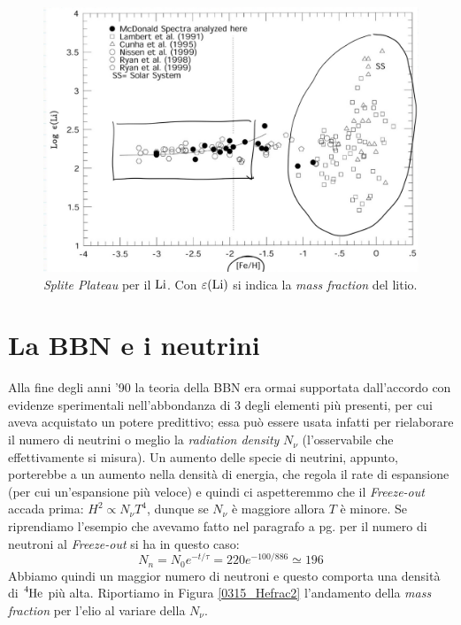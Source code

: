 \begin{figure}[h]
    \centering
    \includegraphics[scale=0.25]{Immagini/0315_LiH.png}
    \caption{\textit{Splite Plateau} per il $\ce{Li}$. Con $\varepsilon (\ce{Li})$ si indica la \textit{mass fraction} del litio.}
    \label{0315_LiH}
\end{figure}
\newpage
\section{La BBN e i neutrini}
Alla fine degli anni '90 la teoria della BBN era ormai supportata dall'accordo con evidenze sperimentali nell'abbondanza di 3 degli elementi più presenti, %
per cui aveva acquistato un potere predittivo; essa può essere usata infatti per rielaborare il numero di neutrini o meglio la \textit{radiation density} $N_\nu$ (l'osservabile che effettivamente si misura). Un aumento delle specie di neutrini, appunto, porterebbe a un aumento nella densità di energia, che regola il rate di espansione (per cui un'espansione più veloce) e quindi ci aspetteremmo che il \textit{Freeze-out} accada prima: $H^2 \propto N_\nu T^4$, dunque se $N_\nu $ è maggiore allora $T$ è minore. Se riprendiamo l'esempio che avevamo fatto nel paragrafo  a pg. \pageref{a.grandi.linee} per il numero di neutroni al \textit{Freeze-out} si ha in questo caso:
$$N_n = N_0 e^{-t/\tau} = 220 e^{-100/886} \simeq 196$$
Abbiamo quindi un maggior numero di neutroni e questo comporta una densità di $\ce{^4He}$ più alta. Riportiamo in Figura \ref{0315_Hefrac2} l'andamento della \textit{mass fraction} per l'elio al variare della $N_\nu$.

